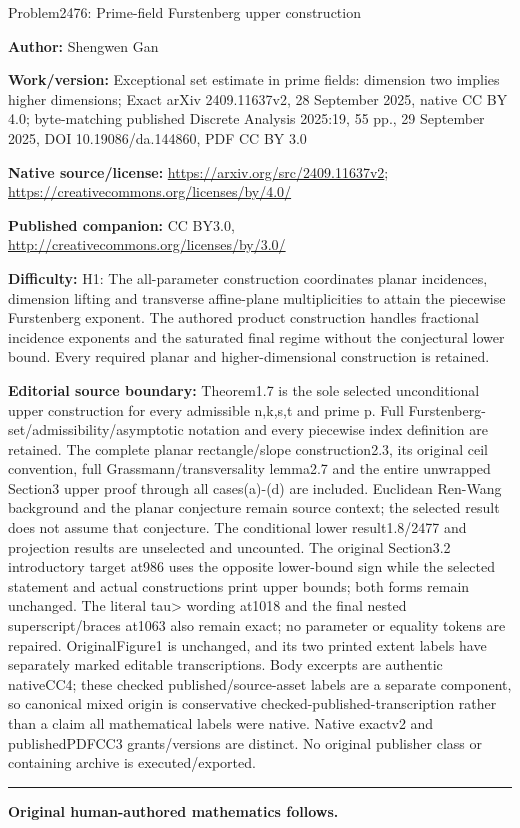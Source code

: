 \documentclass[10pt]{article}
\begin{document}
\begin{center}\Large Problem2476: Prime-field Furstenberg upper construction\end{center}\noindent\textbf{Author:} Shengwen Gan\par\noindent\textbf{Work/version:} Exceptional set estimate in prime fields: dimension two implies higher dimensions; Exact arXiv 2409.11637v2, 28 September 2025, native CC BY 4.0; byte-matching published Discrete Analysis 2025:19, 55 pp., 29 September 2025, DOI 10.19086/da.144860, PDF CC BY 3.0\par\noindent\textbf{Native source/license:} \url{https://arxiv.org/src/2409.11637v2}; \url{https://creativecommons.org/licenses/by/4.0/}\par\noindent\textbf{Published companion:} CC BY3.0, \url{http://creativecommons.org/licenses/by/3.0/}\par\noindent\textbf{Difficulty:} H1: The all-parameter construction coordinates planar incidences, dimension lifting and transverse affine-plane multiplicities to attain the piecewise Furstenberg exponent. The authored product construction handles fractional incidence exponents and the saturated final regime without the conjectural lower bound. Every required planar and higher-dimensional construction is retained.\par\medskip\noindent\textbf{Editorial source boundary:} Theorem1.7 is the sole selected unconditional upper construction for every admissible n,k,s,t and prime p. Full Furstenberg-set/admissibility/asymptotic notation and every piecewise index definition are retained. The complete planar rectangle/slope construction2.3, its original ceil convention, full Grassmann/transversality lemma2.7 and the entire unwrapped Section3 upper proof through all cases(a)-(d) are included. Euclidean Ren-Wang background and the planar conjecture remain source context; the selected result does not assume that conjecture. The conditional lower result1.8/2477 and projection results are unselected and uncounted. The original Section3.2 introductory target at986 uses the opposite lower-bound sign while the selected statement and actual constructions print upper bounds; both forms remain unchanged. The literal tau> wording at1018 and the final nested superscript/braces at1063 also remain exact; no parameter or equality tokens are repaired. OriginalFigure1 is unchanged, and its two printed extent labels have separately marked editable transcriptions. Body excerpts are authentic nativeCC4; these checked published/source-asset labels are a separate component, so canonical mixed origin is conservative checked-published-transcription rather than a claim all mathematical labels were native. Native exactv2 and publishedPDFCC3 grants/versions are distinct. No original publisher class or containing archive is executed/exported.\par\medskip\hrule\medskip\noindent\textbf{Original human-authored mathematics follows.}\par
\end{document}
